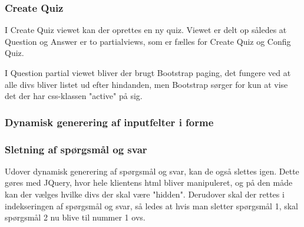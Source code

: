 \subsubsection{Create Quiz}
I Create Quiz viewet kan der oprettes en ny quiz. Viewet er delt op således at Question og Answer er to partialviews, som er fælles for Create Quiz og Config Quiz.

I Question partial viewet bliver der brugt Bootstrap paging, det fungere ved at alle divs bliver listet ud efter hindanden, men Bootstrap sørger for kun at vise det der har css-klassen "active" på sig.

\subsubsection*{Dynamisk generering af inputfelter i forme}

\subsubsection*{Sletning af spørgsmål og svar}
Udover dynamisk generering af spørgsmål og svar, kan de også slettes igen. Dette gøres med JQuery, hvor hele klientens html bliver manipuleret, og på den måde kan der vælges hvilke divs der skal være "hidden". Derudover skal der rettes i indekseringen af spørgsmål og svar, så ledes at hvis man sletter spørgsmål 1, skal spørgsmål 2 nu blive til nummer 1 ovs.